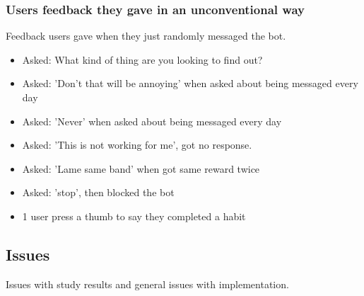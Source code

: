 \subsubsection*{Users feedback they gave in an unconventional way}
Feedback users gave when they just randomly messaged the bot.

\begin{itemize}
  \item Asked: What kind of thing are you looking to find out?
  \item Asked: 'Don't that will be annoying' when asked about being messaged every day
  \item Asked: 'Never' when asked about being messaged every day
  \item Asked: 'This is not working for me', got no response.
  \item Asked: 'Lame same band' when got same reward twice
  \item Asked: 'stop', then blocked the bot
  \item 1 user press a thumb to say they completed a habit
\end{itemize}


\subsection{Issues}
Issues with study results and general issues with implementation.

